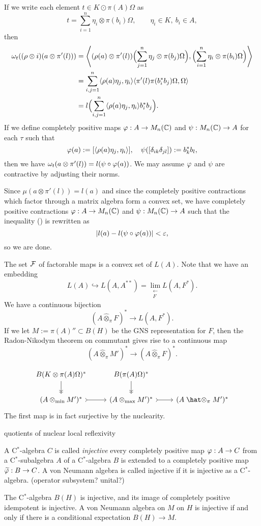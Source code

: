 \documentclass{../../large}
\begin{document}
\begin{pf}
If we write each element $t\in K\odot\pi(A)\Omega$ as
\[t=\sum_{i=1}^n\eta_i\otimes\pi(b_i)\Omega,\qquad\eta_i\in K,\ b_i\in A,\]
then
\begin{align*}
\omega_t((\rho\otimes i)(a\otimes\pi'(l)))
&=\left\langle(\rho(a)\otimes\pi'(l))\Bigl(\sum_{j=1}^n\eta_j\otimes\pi(b_j)\Omega\Bigr),\Bigl(\sum_{i=1}^n\eta_i\otimes\pi(b_i)\Omega\Bigr)\right\rangle\\
&=\sum_{i,j=1}^n\langle\rho(a)\eta_j,\eta_i\rangle\langle\pi'(l)\pi(b_i^*b_j)\Omega,\Omega\rangle\\
&=l\Bigl(\sum_{i,j=1}^n\langle\rho(a)\eta_j,\eta_i\rangle b_i^*b_j\Bigr).
\end{align*}
If we define completely positive maps $\varphi:A\to M_n(\mathbb{C})$ and $\psi:M_n(\mathbb{C})\to A$ for each $\tau$ such that
\[\varphi(a):=[\langle\rho(a)\eta_j,\eta_i\rangle],\quad\psi([\delta_{ik}\delta_{jl}]):=b_k^*b_l,\]
then we have $\omega_t(a\otimes\pi'(l))=l(\psi\circ\varphi(a))$.
We may assume $\varphi$ and $\psi$ are contractive by adjusting their norms.

Since $\mu(a\otimes\pi'(l))=l(a)$ and since the completely positive contractions which factor through a matrix algebra form a convex set, we have completely positive contractions $\varphi:A\to M_n(\mathbb{C})$ and $\psi:M_n(\mathbb{C})\to A$ such that the inequality (\dagger) is rewritten as
\[|l(a)-l(\psi\circ\varphi(a))|<\varepsilon,\]
so we are done.
\end{pf}

The set $\mathcal{F}$ of factorable maps is a convex set of $L(A)$.
Note that we have an embedding
\[L(A)\hookrightarrow L(A,A^{**})=\lim_{\substack{\longleftarrow\\F}}L(A,F^*).\]
We have a continuous bijection
\[(A\hat\otimes_\pi F)^*\to L(A,F^*).\]
If we let $M:=\pi(A)''\subset B(H)$ be the GNS representation for $F$, then the Radon-Nikodym theorem on commutant gives rise to a continuous map
\[(A\mathrel{\hat\otimes}_\pi M')^*\to(A\mathrel{\hat\otimes}_\pi F)^*.\]

\[\begin{tikzcd}
B(K\otimes\pi(A)\Omega)^* \dar[->>] & B(\pi(A)\Omega)^* \dar[->>] &\\
(A\otimes_{\min}M')^*\rar[>->]
&(A\otimes_{\max}M')^*\rar[>->]
&(A\mathrel{\hat\otimes}_\pi M')^*
\end{tikzcd}\]
The first map is in fact surjective by the nuclearity.





quotients of nuclear
local reflexivity



\begin{prb}
A C$^*$-algebra $C$ is called \emph{injective} every completely positive map $\varphi:A\to C$ from a C$^*$-subalgebra $A$ of a C$^*$-algebra $B$ is extended to a completely positive map $\widetilde{\varphi}:B\to C$.
A von Neumann algebra is called injective if it is injective as a C$^*$-algebra.
(operator subsystem? unital?)

The C$^*$-algebra $B(H)$ is injective, and its image of completely positive idempotent is injective.
A von Neumann algebra on $M$ on $H$ is injective if and only if there is a conditional expectation $B(H)\to M$.

\end{prb}
\end{document}
